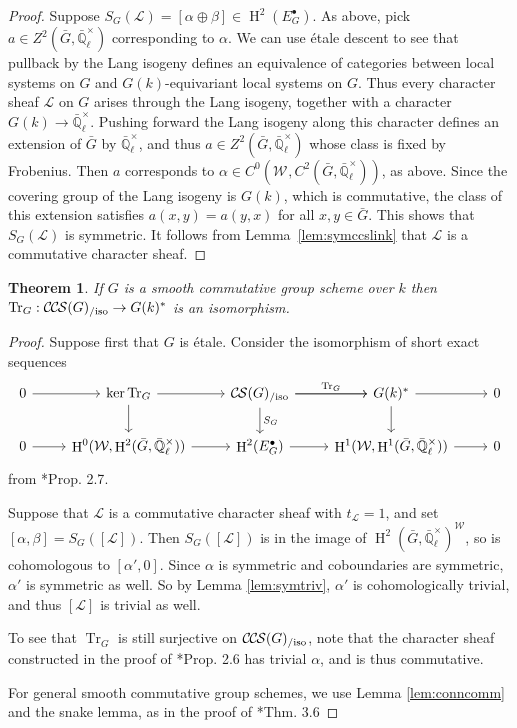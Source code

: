 \documentclass[10pt]{amsart}
\theoremstyle{plain}
\newtheorem{theorem}{Theorem}[section]
\theoremstyle{definition}
\newcommand{\EE}{\mathbb{\bar Q}_\ell}
\newcommand{\Fq}{k}
\newcommand{\EEx}{\EE^\times}
\newcommand{\Weil}[1]{\mathcal{W}_{#1}}
\DeclareMathOperator{\Hh}{H}
\newcommand{\trFrob}[1]{t_{#1}}
\newcommand{\TrFrob}[1]{\operatorname{Tr}_{#1}}
\newcommand{\cs}[1]{{\mathcal{#1}}}
\newcommand{\CS}{{\mathcal{C\hskip-0.8pt S}}}
\newcommand{\CCS}{{\mathcal{C\hskip-.8pt C\hskip-0.8pt S}}}
\newcommand{\CSiso}[1]{\CS(#1)_{/\text{iso}}}
\newcommand{\CCSiso}[1]{\CCS(#1)_{/\text{iso}}}
\newcommand{\bG}{\bar{G}}
\begin{document}
\begin{proof}
Suppose $S_G(\cs{L}) = [\alpha\oplus \beta]\in \Hh^2(E_G^\bullet)$.
As above, pick $a \in Z^2(\bG, \EEx)$ corresponding to $\alpha$. 
We can use \'etale descent to see that pullback by the Lang isogeny defines an equivalence
of categories between local systems on $G$ and $G(\Fq)$-equivariant local systems on $G$.  
Thus every character sheaf $\cs{L}$ on $G$ arises through the Lang isogeny, together with a character $G(\Fq) \to \EEx$.
Pushing forward the Lang isogeny along this character defines an extension of $\bG$ by $\EEx$, and thus $a\in Z^2(\bG, \EEx)$ whose class is fixed by Frobenius.
Then $a$ corresponds to $\alpha \in C^0(\Weil{}, C^2(\bG, \EEx))$, as above.
Since the covering group of the Lang isogeny is $G(k)$, which is commutative, the class of this extension satisfies $a(x,y) = a(y,x)$ for all $x,y \in \bG$. 
This shows that $S_{G}(\cs{L})$ is symmetric.
It follows from Lemma~\ref{lem:symccslink} that $\cs{L}$ is a commutative character sheaf.
\end{proof}

\begin{theorem} \label{thm:trfrobiso}
If $G$ is a smooth commutative group scheme over $\Fq$ then $\TrFrob{G} : \CCSiso{G} \to G(\Fq)^*$ is an isomorphism.
\end{theorem}

\begin{proof}
Suppose first that $G$ is \'etale.  Consider the isomorphism of short exact sequences
\[
\begin{tikzcd}
 0 \arrow{r} & \ker \TrFrob{G} \arrow{d} \arrow{r} & \CSiso{G}\arrow{d}{S_G} \arrow{r}{\TrFrob{G}} \arrow{r} & G(\Fq)^* \arrow{d} \arrow{r} & 0\\
  0 \arrow{r} & \Hh^0(\Weil{},\Hh^2(\bG,\EEx)) \arrow{r} & \Hh^2(E^\bullet_G) \arrow{r} & \Hh^1(\Weil{},\Hh^1(\bG,\EEx)) \arrow{r} & 0
 \end{tikzcd}
 \]
from \cite{cunningham-roe:13a}*{Prop. 2.7}.

Suppose that $\cs{L}$ is a commutative character sheaf with $\trFrob{\cs{L}} = 1$, and set $[\alpha, \beta] = S_G([\cs{L}])$.
Then $S_G([\cs{L}])$ is in the image of $\Hh^2(\bG, \EEx)^\Weil{}$, so is cohomologous to
$[\alpha', 0]$.  Since $\alpha$ is symmetric and coboundaries are symmetric, $\alpha'$ is symmetric as well.
So by Lemma \ref{lem:symtriv}, $\alpha'$ is cohomologically trivial, and thus $[\cs{L}]$ is trivial as well.

To see that $\TrFrob{G}$ is still surjective on $\CCSiso{G}$, note that the character sheaf constructed in the proof of
\cite{cunningham-roe:13a}*{Prop. 2.6} has trivial $\alpha$, and is thus commutative.

For general smooth commutative group schemes, we use Lemma \ref{lem:conncomm} and the snake lemma, as in the proof of
\cite{cunningham-roe:13a}*{Thm. 3.6}
\end{proof}
\end{document}
